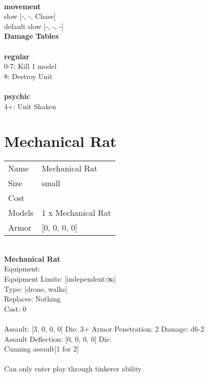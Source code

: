 \ \\ {\bf movement } \\
slow [-, -, Chase] \\
default slow [-, -, -] \\


{\bf Damage Tables} \\
\ \\ {\bf regular } \\
0-7: Kill 1 model \\
8: Destroy Unit \\
\ \\ {\bf psychic } \\
4+: Unit Shaken \\










\pagebreak\pagebreak

\section{ Mechanical Rat }

\begin{tabular}{ll}
  Name & Mechanical Rat \\
  Size & small\\
  Cost & \\
  Models & 1 x Mechanical Rat\\
  Armor & [0, 0, 0, 0]\\
\end{tabular}

\noindent \\ 


{\bf Mechanical Rat } \\
Equipment:  \\
Equipment Limits: [independent:∞] \\
Type: [drone, walks] \\
Replaces: Nothing \\
Cost: 0\\
\ \\
Assault: [3, 0, 0, 0] Die: 3+ Armor Penetration: 2 Damage: d6-2 \\
Assault Deflection: [0, 0, 0, 0] Die: \\
\indent Cunning assault[1 for 2]\\ 
 
\ \\
Can only enter play through tinkerer ability\\ 

